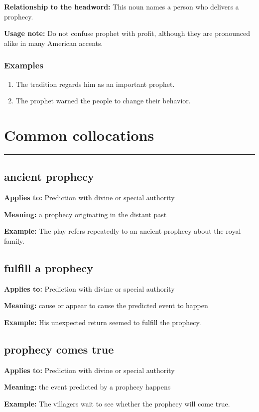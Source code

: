 \documentclass[11pt]{article}
\newcommand{\sectionrule}{\par\vspace{-0.5em}\noindent\textcolor{Accent}{\rule{\linewidth}{0.6pt}}\par}
\begin{document}
\textbf{Relationship to the headword:} This noun names a person who delivers a prophecy.

\textbf{Usage note:} Do not confuse prophet with profit, although they are pronounced alike in many American accents.

\subsubsection{Examples}
\begin{enumerate}
  \item The tradition regards him as an important prophet.
  \item The prophet warned the people to change their behavior.
\end{enumerate}

\section{Common collocations}
\sectionrule
\subsection{ancient prophecy}
\textbf{Applies to:} Prediction with divine or special authority

\textbf{Meaning:} a prophecy originating in the distant past

\textbf{Example:} The play refers repeatedly to an ancient prophecy about the royal family.

\subsection{fulfill a prophecy}
\textbf{Applies to:} Prediction with divine or special authority

\textbf{Meaning:} cause or appear to cause the predicted event to happen

\textbf{Example:} His unexpected return seemed to fulfill the prophecy.

\subsection{prophecy comes true}
\textbf{Applies to:} Prediction with divine or special authority

\textbf{Meaning:} the event predicted by a prophecy happens

\textbf{Example:} The villagers wait to see whether the prophecy will come true.
\end{document}
